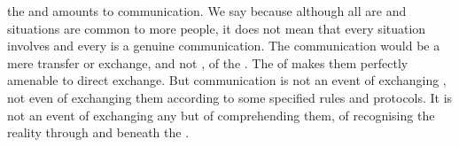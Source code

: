 

 the  and  amounts to communication. We
say  because although all  are 
 and situations are  
common to more people, it does not mean that every 
situation involves and every  is a genuine communication. The
 communication would be 
a mere transfer or exchange, and not , of the . The
 of  makes them perfectly amenable to direct
exchange. But communication is not an event of exchanging , not even
of exchanging them according to some specified rules and protocols. It is not an
event of exchanging any  but of comprehending
them, of recognising the  reality through and beneath the .

